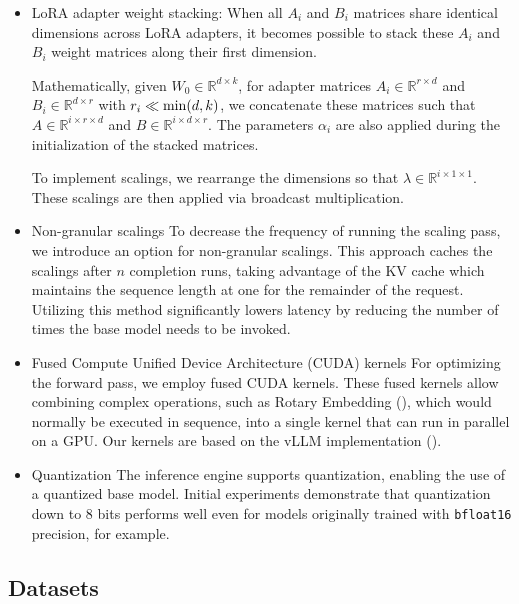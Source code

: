 \begin{itemize}
    \item LoRA adapter weight stacking: When all $A_i$ and $B_i$ matrices share identical dimensions across LoRA adapters, it becomes possible to stack these $A_i$ and $B_i$ weight matrices along their first dimension.

Mathematically, given $W_0 \in \mathbb{R}^{d \times k}$, for adapter matrices $A_i \in \mathbb{R}^{r \times d}$ and $B_i \in \mathbb{R}^{d \times r}$ with $r_i \ll {\rm min} (d,k)$, we concatenate these matrices such that $A\in \mathbb{R}^{i \times r \times d}$ and $B\in \mathbb{R}^{i \times d \times r}$. The parameters $\alpha_i$ are also applied during the initialization of the stacked matrices.

To implement scalings, we rearrange the dimensions so that $\lambda \in \mathbb{R} ^ {i \times 1 \times 1}$. These scalings are then applied via broadcast multiplication.

\item Non-granular scalings To decrease the frequency of running the scaling pass, we introduce an option for non-granular scalings. This approach caches the scalings after $n$ completion runs, taking advantage of the KV cache which maintains the sequence length at one for the remainder of the request. Utilizing this method significantly lowers latency by reducing the number of times the base model needs to be invoked.

\item Fused Compute Unified Device Architecture (CUDA) kernels For optimizing the forward pass, we employ fused CUDA kernels. These fused kernels allow combining complex operations, such as Rotary Embedding (\cite{su2021roformer}), which would normally be executed in sequence, into a single kernel that can run in parallel on a GPU. Our kernels are based on the vLLM implementation (\cite{kwon2023efficient}).

\item Quantization The inference engine supports quantization, enabling the use of a quantized base model. Initial experiments demonstrate that quantization down to 8 bits performs well even for models originally trained with \texttt{bfloat16} precision, for example.

\end{itemize}

\subsection{Datasets}

